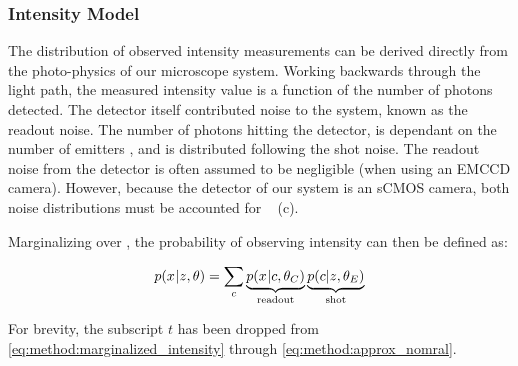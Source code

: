 \subsubsection{Intensity Model}
The distribution of observed intensity measurements can be derived directly from the photo-physics of our microscope system.
  Working backwards through the light path, the measured intensity value \x{} is a function of the number of photons \photons detected.
  The detector itself contributed noise to the system, known as the readout noise. 
  The number of photons hitting the detector, is dependant on the number of emitters \z, and is distributed following the shot noise.
  The readout noise from the detector is often assumed to be negligible (\ie when using an EMCCD camera).
  However, because the detector of our system is an sCMOS camera, both noise distributions must be accounted for
  ~\cite{huang_video-rate_2013} (c).

  Marginalizing over \photons, the probability of observing intensity \x{} can then be defined as:

  \begin{equation}
    p(x_{}|z_{},\theta) = \sum_c \underbrace{p(x_{}|c,\theta_C)}_{\text{readout}} 
    \underbrace{p(c|z_{},\theta_E)}_{\text{shot}}
    \label{eq:method:marginalized_intensity}
  \end{equation}

  For brevity, the subscript $t$ has been dropped from \eqref{eq:method:marginalized_intensity} through \eqref{eq:method:approx_nomral}.

